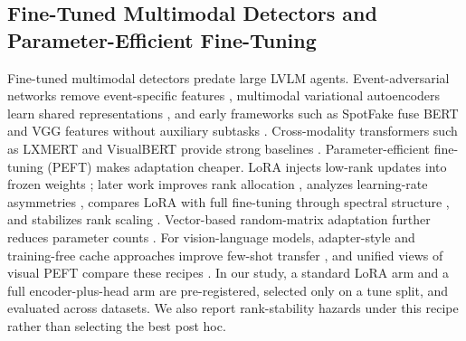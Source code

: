 \documentclass{article} %
\begin{document}
\subsection{Fine-Tuned Multimodal Detectors and Parameter-Efficient Fine-Tuning}
Fine-tuned multimodal detectors predate large LVLM agents. Event-adversarial networks remove event-specific features \citep{Wang2018EannEvent}, multimodal variational autoencoders learn shared representations \citep{Khattar2019MvaeMultimodal}, and early frameworks such as SpotFake fuse BERT and VGG features without auxiliary subtasks \citep{Singhal2019SpotfakeMultimodal}. Cross-modality transformers such as LXMERT and VisualBERT provide strong baselines \citep{Tan2019LxmertLearning, Li2019VisualbertSimple}. Parameter-efficient fine-tuning (PEFT) makes adaptation cheaper. LoRA injects low-rank updates into frozen weights \citep{Hu2021LoraLowrank}; later work improves rank allocation \citep{Zhang2023AdaloraAdaptive}, analyzes learning-rate asymmetries \citep{Hayou2024LoraEfficient}, compares LoRA with full fine-tuning through spectral structure \citep{Shuttleworth2024LoraVs}, and stabilizes rank scaling \citep{Kalajdzievski2023RankStabilization}. Vector-based random-matrix adaptation further reduces parameter counts \citep{Kopiczko2023VeraVectorbased}. For vision-language models, adapter-style and training-free cache approaches improve few-shot transfer \citep{Gao2021ClipadapterBetter, Zhang2022TipadapterTrainingfree}, and unified views of visual PEFT compare these recipes \citep{Yu2022TowardsUnified}. In our study, a standard LoRA arm and a full encoder-plus-head arm are pre-registered, selected only on a tune split, and evaluated across datasets. We also report rank-stability hazards under this recipe rather than selecting the best post hoc.
\end{document}
